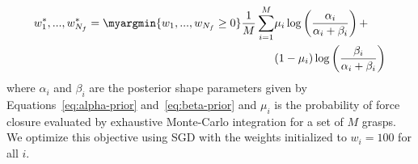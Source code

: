 \begin{align*}
	w_1^*, ..., w_{N_f}^* = \myargmin{w_1, ..., w_{N_f} \geq 0} \frac{1}{M} \sum \limits_{i=1}^M &\mu_i \log \left( \frac{\alpha_i}{\alpha_i + \beta_i} \right) + \\  &(1 - \mu_i) \log \left( \frac{\beta_i}{\alpha_i + \beta_i} \right)
\end{align*}
\noindent where $\alpha_i$ and $\beta_i$ are the posterior shape parameters given by Equations~\ref{eq:alpha-prior} and~\ref{eq:beta-prior} and $\mu_i$ is the probability of force closure evaluated by exhaustive Monte-Carlo integration for a set of $M$ grasps.
We optimize this objective using SGD with the weights initialized to $w_i = 100$ for all $i$.
